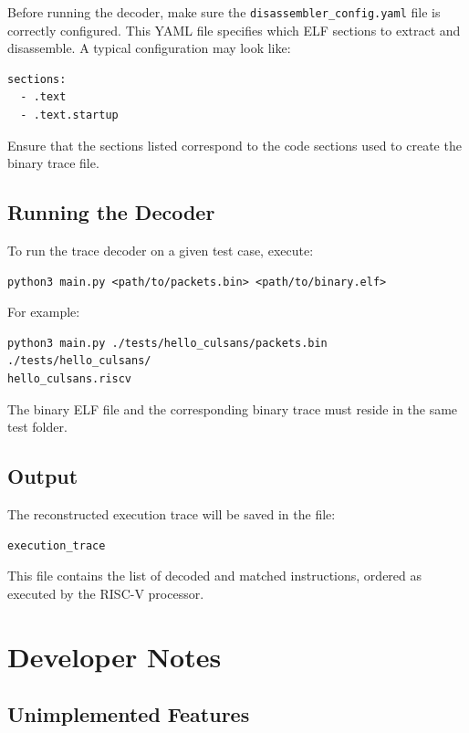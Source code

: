 \documentclass[a4paper,12pt]{article}
\begin{document}
Before running the decoder, make sure the \texttt{disassembler\_config.yaml} file is correctly configured. This YAML file specifies which ELF sections to extract and disassemble. A typical configuration may look like:

\begin{verbatim}
sections:
  - .text
  - .text.startup
\end{verbatim}

Ensure that the sections listed correspond to the code sections used to create the binary trace file.

\subsection{Running the Decoder}

To run the trace decoder on a given test case, execute:

\begin{verbatim}
python3 main.py <path/to/packets.bin> <path/to/binary.elf>
\end{verbatim}

For example:

\begin{verbatim}
python3 main.py ./tests/hello_culsans/packets.bin ./tests/hello_culsans/
hello_culsans.riscv
\end{verbatim}

The binary ELF file and the corresponding binary trace must reside in the same test folder.

\subsection{Output}

The reconstructed execution trace will be saved in the file:

\begin{verbatim}
execution_trace
\end{verbatim}

This file contains the list of decoded and matched instructions, ordered as executed by the RISC-V processor.

\section{Developer Notes}
\subsection{Unimplemented Features}
\end{document}
